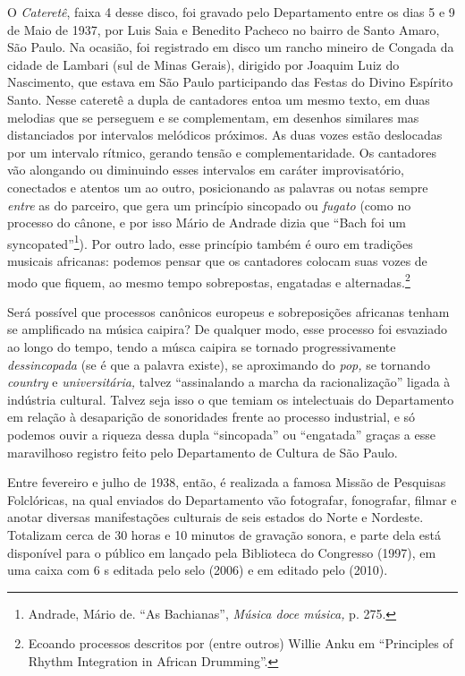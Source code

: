 O \emph{Cateretê}, faixa 4 desse disco, foi gravado pelo Departamento
entre os dias 5 e 9 de Maio de 1937, por Luis Saia e Benedito Pacheco no
bairro de Santo Amaro, São Paulo. Na ocasião, foi registrado em disco um
rancho mineiro de Congada da cidade de Lambari (sul de Minas Gerais),
dirigido por Joaquim Luiz do Nascimento, que estava em São Paulo
participando das Festas do Divino Espírito Santo. Nesse cateretê a dupla
de cantadores entoa um mesmo texto, em duas melodias que se perseguem e
se complementam, em desenhos similares mas distanciados por intervalos
melódicos próximos. As duas vozes estão deslocadas por um intervalo
rítmico, gerando tensão e complementaridade. Os cantadores vão alongando
ou diminuindo esses intervalos em caráter improvisatório, conectados e
atentos um ao outro, posicionando as palavras ou notas sempre
\emph{entre} as do parceiro, que gera um princípio sincopado ou
\emph{fugato} (como no processo do cânone, e por isso Mário de Andrade
dizia que ``Bach foi um syncopated''\footnote{Andrade, Mário de. ``As
  Bachianas'', \emph{Música doce música,} p. 275.}). Por outro lado,
esse princípio também é ouro em tradições musicais africanas: podemos
pensar que os cantadores colocam suas vozes de modo que fiquem, ao mesmo
tempo sobrepostas, engatadas e alternadas.\footnote{Ecoando processos
  descritos por (entre outros) Willie Anku em ``Principles of Rhythm
  Integration in African Drumming''.}

Será possível que processos canônicos europeus e sobreposições africanas
tenham se amplificado na música caipira? De qualquer modo, esse processo
foi esvaziado ao longo do tempo, tendo a músca caipira se tornado
progressivamente \emph{dessincopada} (se é que a palavra existe), se
aproximando do \emph{pop,} se tornando \emph{country} e
\emph{universitária,} talvez ``assinalando a marcha da racionalização''
ligada à indústria cultural. Talvez seja isso o que temiam os
intelectuais do Departamento em relação à desaparição de sonoridades
frente ao processo industrial, e só podemos ouvir a riqueza dessa dupla
``sincopada'' ou ``engatada'' graças a esse maravilhoso registro feito
pelo Departamento de Cultura de São Paulo.

Entre fevereiro e julho de 1938, então, é realizada a famosa Missão de
Pesquisas Folclóricas, na qual enviados do Departamento vão fotografar,
fonografar, filmar e anotar diversas manifestações culturais de seis
estados do Norte e Nordeste. Totalizam cerca de 30 horas e 10 minutos de
gravação sonora, e parte dela está disponível para o público em 
lançado pela Biblioteca do Congresso (1997), em uma caixa com 6 s
editada pelo selo  (2006) e em  editado pelo  (2010).

